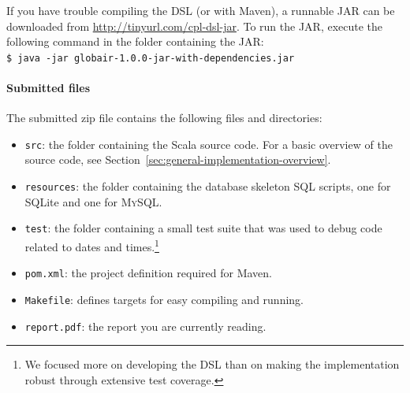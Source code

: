 \documentclass[a4paper]{article}
\newcommand{\cc}[1]{\texttt{#1}}
\begin{document}
If you have trouble compiling the DSL (or with Maven), a runnable JAR can be downloaded from \url{http://tinyurl.com/cpl-dsl-jar}.
To run the JAR, execute the following command in the folder containing the JAR:\\
\cc{\$ java -jar globair-1.0.0-jar-with-dependencies.jar}

\paragraph{Submitted files}
The submitted zip file contains the following files and directories:

\begin{itemize}
\item \cc{src}: the folder containing the Scala source code.
  For a basic overview of the source code, see Section~\ref{sec:general-implementation-overview}.
\item \cc{resources}: the folder containing the database skeleton SQL scripts, one for SQLite and one for \textsc{MySQL}\@.
\item \cc{test}: the folder containing a small test suite that was used to debug code related to dates and times.\footnote{We focused more on developing the DSL than on making the implementation robust through extensive test coverage.}
\item \cc{pom.xml}: the project definition required for Maven.
\item \cc{Makefile}: defines targets for easy compiling and running.
\item \cc{report.pdf}: the report you are currently reading.
\end{itemize}
\end{document}
